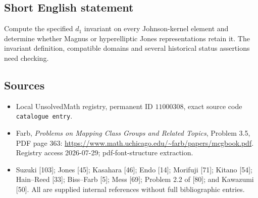 \documentclass[11pt]{article}
\begin{document}
\subsection{Short English statement}
Compute the specified \(d_1\) invariant on every Johnson-kernel element and determine whether Magnus or hyperelliptic Jones representations retain it. The invariant definition, compatible domains and several historical status assertions need checking.
\subsection{Sources}
\begin{itemize}
\item Local UnsolvedMath registry, permanent ID \(11000308\), exact source code \texttt{catalogue entry}.
\item Farb, \emph{Problems on Mapping Class Groups and Related Topics}, Problem 3.5, PDF page 363: \url{https://www.math.uchicago.edu/~farb/papers/mcgbook.pdf}. Registry access 2026-07-29; pdf-font-structure extraction.
\item Suzuki [103]; Jones [45]; Kasahara [46]; Endo [14]; Morifuji [71]; Kitano [54]; Hain--Reed [33]; Biss--Farb [5]; Mess [69]; Problem 2.2 of [80]; and Kawazumi [50]. All are supplied internal references without full bibliographic entries.
\end{itemize}
\end{document}
